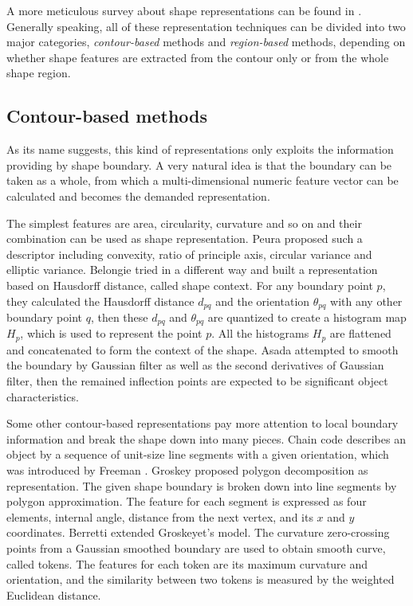 \documentclass[review,onefignum,onetabnum]{siamonline190516}
\begin{document}
    A more meticulous survey about shape representations can be found in \cite{zhang2004review}. Generally speaking, all of these representation techniques can be divided into two major categories, \textit{contour-based} methods and \textit{region-based} methods, depending on whether shape features are extracted from the contour only or from the whole shape region.

    \subsection{Contour-based methods}
        As its name suggests, this kind of representations only exploits the information providing by shape boundary. A very natural idea is that the boundary can be taken as a whole, from which a multi-dimensional numeric feature vector can be calculated and becomes the demanded representation.

        The simplest features are area, circularity, curvature and so on and their combination can be used as shape representation. Peura \etal \cite{peura1997efficiency} proposed such a descriptor including convexity, ratio of principle axis, circular variance and elliptic variance. Belongie \etal \cite{belongie2002shape} tried in a different way and built a representation based on Hausdorff distance, called shape context. For any boundary point $p$, they calculated the Hausdorff distance $d_{pq}$ and the orientation $\theta_{pq}$ with any other boundary point $q$, then these $d_{pq}$ and $\theta_{pq}$ are quantized to create a histogram map $H_p$, which is used to represent the point $p$. All the histograms $H_p$ are flattened and concatenated to form the context of the shape. Asada \etal \cite{asada1986curvature} attempted to smooth the boundary by Gaussian filter as well as the second derivatives of Gaussian filter, then the remained inflection points are expected to be significant object characteristics.

        Some other contour-based representations pay more attention to local boundary information and break the shape down into many pieces. Chain code describes an object by a sequence of unit-size line segments with a given orientation, which was introduced by Freeman \etal \cite{freeman1961encoding}. Groskey \etal \cite{grosky1990index} proposed polygon decomposition as representation. The given shape boundary is broken down into line segments by polygon approximation. The feature for each segment is expressed as four elements, internal angle, distance from the next vertex, and its $x$ and $y$ coordinates. Berretti \etal \cite{berretti2000retrieval} extended Groskeyet's model. The curvature zero-crossing points from a Gaussian smoothed boundary are used to obtain smooth curve, called tokens. The features for each token are its maximum curvature and orientation, and the similarity between two tokens is measured by the weighted Euclidean distance. 
    
\end{document}
